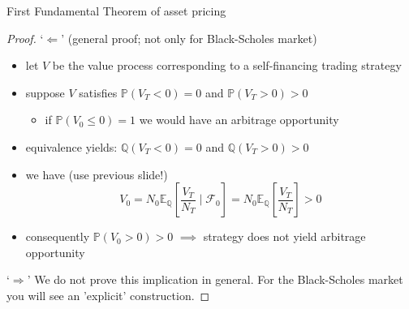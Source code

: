 \documentclass[pdf, handout]{beamer}
\renewcommand{\calF}{\mathcal{F}}
\begin{document}
\begin{frame}{First Fundamental Theorem of asset pricing}
\begin{proof} `$\Leftarrow$' (general proof; not only for Black-Scholes market)
\begin{itemize}
\item let $V$ be the value process corresponding to a self-financing trading strategy
\item suppose $V$ satisfies $\mathbb{P}(V_T < 0 ) =0$ and $\mathbb{P}(V_T>0) >0$
\begin{itemize}
\item if $\mathbb{P}(V_0 \leq 0)=1$ we would have an arbitrage opportunity
\end{itemize}
\item equivalence yields: $\mathbb{Q}(V_T < 0 ) =0$ and $\mathbb{Q}(V_T>0) >0$
\item we have (use previous slide!)
\[
V_0 = N_0 \mathbb{E}_\mathbb{Q} \left[  \frac{V_T}{N_T} \mid \calF_0 \right]
=N_0 \mathbb{E}_\mathbb{Q} \left[  \frac{V_T}{N_T}  \right] >0
\]
\item consequently $\mathbb{P}(V_0>0)>0$ $\implies$ strategy does not yield arbitrage opportunity 
\end{itemize}
`$\Rightarrow$' We do not prove this implication in general. For the Black-Scholes market you will see an 'explicit' construction.
\end{proof}
\end{frame}
\end{document}
